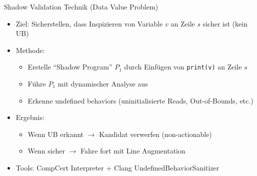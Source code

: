 ﻿\documentclass{beamer}
\begin{document}
\begin{frame}{Shadow Validation Technik (Data Value Problem)}
  \begin{itemize}
    \item Ziel: Sicherstellen, dass Inspizieren von Variable $v$ an Zeile $s$ sicher ist (kein UB)
    \item Methode:
      \begin{itemize}
        \item Erstelle ``Shadow Program'' $P_1$ durch Einf\"ugen von \texttt{print(v)} an Zeile $s$
        \item F\"uhre $P_1$ mit dynamischer Analyse aus
        \item Erkenne undefined behaviors (uninitialisierte Reads, Out-of-Bounds, etc.)
      \end{itemize}
    \item Ergebnis:
      \begin{itemize}
        \item Wenn UB erkannt $\rightarrow$ Kandidat verwerfen (non-actionable)
        \item Wenn sicher $\rightarrow$ Fahre fort mit Line Augmentation
      \end{itemize}
    \item Tools: CompCert Interpreter + Clang UndefinedBehaviorSanitizer
  \end{itemize}
\end{frame}
\end{document}
